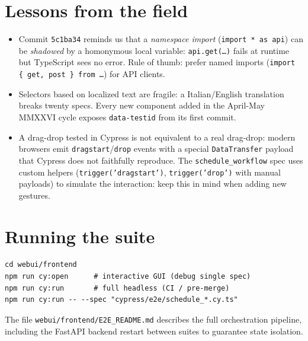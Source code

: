 \section{Lessons from the field}

\begin{erroricomunibox}
\begin{itemize}
  \item Commit \texttt{5c1ba34} reminds us that a
    \emph{namespace import} (\texttt{import * as api}) can be
    \emph{shadowed} by a homonymous local variable:
    \texttt{api.get(\dots)} fails at runtime but TypeScript
    sees no error. Rule of thumb: prefer named imports
    (\texttt{import \{ get, post \} from \dots}) for API
    clients.
  \item Selectors based on localized text are fragile: a
    Italian/English translation breaks twenty specs. Every new
    component added in the April-May MMXXVI cycle exposes
    \texttt{data-testid} from its first commit.
  \item A drag-drop tested in Cypress is not equivalent to a
    real drag-drop: modern browsers emit
    \texttt{dragstart}/\texttt{drop} events with a special
    \texttt{DataTransfer} payload that Cypress does not
    faithfully reproduce. The \texttt{schedule\_workflow} spec
    uses custom helpers (\texttt{trigger('dragstart')},
    \texttt{trigger('drop')} with manual payloads) to simulate
    the interaction: keep this in mind when adding new
    gestures.
\end{itemize}
\end{erroricomunibox}

\section{Running the suite}

\begin{lstlisting}[basicstyle=\ttfamily\footnotesize]
cd webui/frontend
npm run cy:open      # interactive GUI (debug single spec)
npm run cy:run       # full headless (CI / pre-merge)
npm run cy:run -- --spec "cypress/e2e/schedule_*.cy.ts"
\end{lstlisting}

The file \texttt{webui/frontend/E2E\_README.md} describes the
full orchestration pipeline, including the FastAPI backend
restart between suites to guarantee state isolation.
